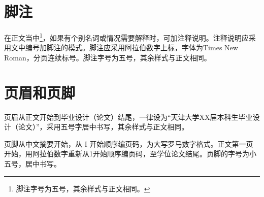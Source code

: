 \section{脚注}

在正文当中\footnote{脚注字号为五号，其余样式与正文相同。}，如果有个别名词或情况需要解释时，可加注释说明。注释说明应采用文中编号加脚注的模式。脚注应采用阿拉伯数字上标，字体为Times New Roman，分页连续标号。脚注字号为五号，其余样式与正文相同。


\section{页眉和页脚}

页眉从正文开始到毕业设计（论文）结尾，一律设为“天津大学XX届本科生毕业设计（论文）”，采用五号字居中书写，其余样式与正文相同。

页脚从中文摘要开始，从 I 开始顺序编页码，为大写罗马数字格式。正文第一页开始，用阿拉伯数字重新从1开始顺序编页码，至学位论文结尾。页脚的字号为小五号，居中书写。
